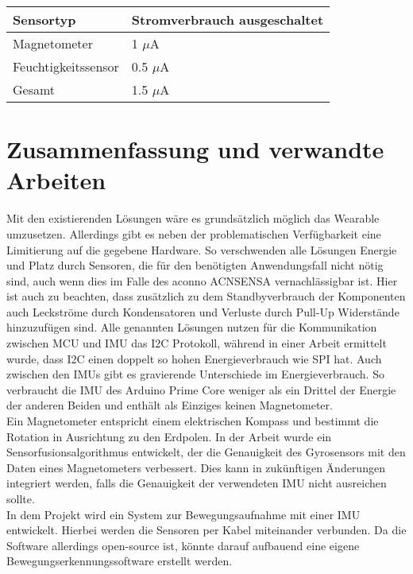 \begin{minipage}{\linewidth}
	\label{tab:cmp_arduino_primo}
	\begin{tabularx}{\linewidth}{X|X}
		Sensortyp & Stromverbrauch ausgeschaltet\\
		\hline
    Magnetometer & 1 $\mu$A \cite{datasheet_lis3mdl}\\
    Feuchtigkeitssensor & 0.5 $\mu$A \cite{datasheet_hts221}\\
    \hline
    Gesamt & 1.5 $\mu$A\\
	\end{tabularx}
\end{minipage}

\section{Zusammenfassung und verwandte Arbeiten}
Mit den existierenden Lösungen wäre es grundsätzlich möglich das Wearable umzusetzen.
Allerdings gibt es neben der problematischen Verfügbarkeit eine Limitierung auf die gegebene Hardware.
So verschwenden alle Lösungen Energie und Platz durch Sensoren, die für den benötigten Anwendungsfall nicht nötig sind, auch wenn dies im Falle des aconno ACNSENSA vernachlässigbar ist.
Hier ist auch zu beachten, dass zusätzlich zu dem Standbyverbrauch der Komponenten auch Leckströme durch Kondensatoren und Verluste durch Pull-Up Widerstände hinzuzufügen sind.
Alle genannten Lösungen nutzen für die Kommunikation zwischen MCU und IMU das I2C Protokoll, während in einer Arbeit \cite{comparison_i2c_spi} ermittelt wurde, dass I2C einen doppelt so hohen Energieverbrauch wie SPI hat.
Auch zwischen den IMUs gibt es gravierende Unterschiede im Energieverbrauch.
So verbraucht die IMU des Arduino Prime Core weniger als ein Drittel der Energie der anderen Beiden und enthält als Einziges keinen Magnetometer.\\
Ein Magnetometer entspricht einem elektrischen Kompass und bestimmt die Rotation in Ausrichtung zu den Erdpolen.
In der Arbeit \cite{sensor_fusion} wurde ein Sensorfusionsalgorithmus entwickelt, der die Genauigkeit des Gyrosensors mit den Daten eines Magnetometers verbessert.
Dies kann in zukünftigen Änderungen integriert werden, falls die Genauigkeit der verwendeten IMU nicht ausreichen sollte.\\
In dem Projekt \cite{project_chordata} wird ein System zur Bewegungsaufnahme mit einer IMU entwickelt.
Hierbei werden die Sensoren per Kabel miteinander verbunden.
Da die Software allerdings open-source ist, könnte darauf aufbauend eine eigene Bewegungserkennungssoftware erstellt werden.
